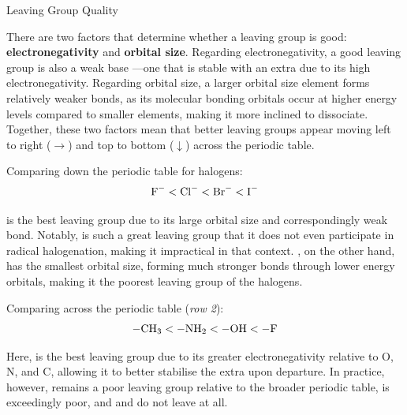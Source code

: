 \documentclass[10pt]{article}
\begin{document}
    \begin{core}{Leaving Group Quality}

      There are two factors that determine whether a leaving group is good: \textbf{electronegativity} and \textbf{orbital size}. Regarding electronegativity, a good leaving group is also a weak base ---one that is stable with an extra  due to its high electronegativity. Regarding orbital size, a larger orbital size element forms relatively weaker bonds, as its molecular bonding orbitals occur at higher energy levels compared to smaller elements, making it more inclined to dissociate. Together, these two factors mean that better leaving groups appear moving left to right ($\rightarrow$) and top to bottom ($\downarrow$) across the periodic table.


      Comparing down the periodic table for halogens:
      \[
        \ce{F-} < \ce{Cl-} < \ce{Br-} < \ce{I-}
      \]

       is the best leaving group due to its large orbital size and correspondingly weak bond. Notably,  is such a great leaving group that it does not even participate in radical halogenation, making it impractical in that context. , on the other hand, has the smallest orbital size, forming much stronger bonds through lower energy orbitals, making it the poorest leaving group of the halogens.

      Comparing across the periodic table (\textit{row 2}):
      \[
        \ce{-CH3} < \ce{-NH2} < \ce{-OH} < \ce{-F}
      \]

      Here,  is the best leaving group due to its greater electronegativity relative to O, N, and C, allowing it to better stabilise the extra  upon departure. In practice, however,  remains a poor leaving group relative to the broader periodic table,  is exceedingly poor, and  and  do not leave at all.


\end{core}
\end{document}
